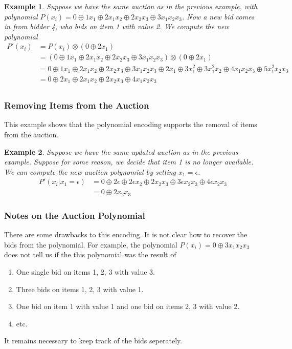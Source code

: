 \documentclass{article}
\newtheorem{example}{Example}
\begin{document}
\begin{example}
	Suppose we have the same auction as in the previous example, with polynomial $P(x_i) = 0 \oplus 1 x_1 \oplus 2 x_1 x_2 \oplus 2 x_2 x_3 \oplus 3 x_1 x_2 x_3$.
	Now a new bid comes in from bidder 4, who bids on item 1 with value 2.
	We compute the new polynomial
	\begin{align*}
		P'(x_i) & = P(x_i) \otimes (0 \oplus 2 x_1)                                                                                                                                  \\
		        & = (0 \oplus 1 x_1 \oplus 2 x_1 x_2 \oplus 2 x_2 x_3 \oplus 3 x_1 x_2 x_3) \otimes (0 \oplus 2 x_1)                                                                 \\
		        & = 0 \oplus 1 x_1 \oplus 2 x_1 x_2 \oplus 2 x_2 x_3 \oplus 3 x_1 x_2 x_3 \oplus 2 x_1 \oplus 3 x_1^2 \oplus 3 x_1^2 x_2 \oplus 4 x_1 x_2 x_3 \oplus 5 x_1^2 x_2 x_3 \\
		        & = 0 \oplus 2 x_1 \oplus 2 x_1 x_2 \oplus 2 x_2 x_3 \oplus 4 x_1 x_2 x_3                                                                                            \\
	\end{align*}
\end{example}

\subsubsection{Removing Items from the Auction}
This example shows that the polynomial encoding supports the removal of items from the auction.

\begin{example}
	Suppose we have the same updated auction as in the previous example.
	Suppose for some reason, we decide that item 1 is no longer available.
	We can compute the new auction polynomial by setting $x_1 = \epsilon$.
	\begin{align*}
		P'(x_i | x_1 = \epsilon) & = 0 \oplus 2 \epsilon \oplus 2 \epsilon x_2 \oplus 2 x_2 x_3 \oplus 3 \epsilon x_2 x_3 \oplus 4 \epsilon x_2 x_3 \\
		                         & = 0 \oplus 2 x_2 x_3
	\end{align*}
\end{example}

\subsubsection{Notes on the Auction Polynomial}
There are some drawbacks to this encoding.
It is not clear how to recover the bids from the polynomial.
For example, the polynomial $P(x_i) = 0 \oplus 3 x_1 x_2 x_3$ does not tell us if the this polynomial was the result of
\begin{enumerate}
	\item One single bid on items 1, 2, 3 with value 3.
	\item Three bids on items 1, 2, 3 with value 1.
	\item One bid on item 1 with value 1 and one bid on items 2, 3 with value 2.
	\item etc.
\end{enumerate}

It remains necessary to keep track of the bids seperately.
\end{document}
